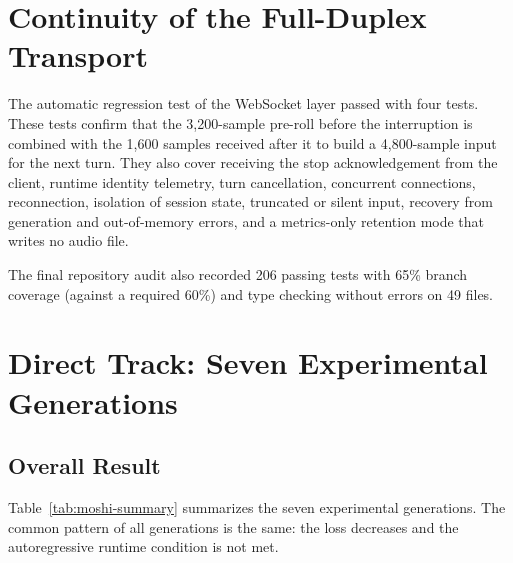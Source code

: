 
\section{Continuity of the Full-Duplex Transport}
\label{sec:res-duplex}

The automatic regression test of the WebSocket layer passed with four tests. These tests
confirm that the 3,200-sample pre-roll before the interruption is combined with the 1,600
samples received after it to build a 4,800-sample input for the next turn. They also cover
receiving the stop acknowledgement from the client, runtime identity telemetry, turn
cancellation, concurrent connections, reconnection, isolation of session state, truncated
or silent input, recovery from generation and out-of-memory errors, and a metrics-only
retention mode that writes no audio file.

The final repository audit also recorded 206 passing tests with 65\% branch coverage
(against a required 60\%) and type checking without errors on 49 files.


\section{Direct Track: Seven Experimental Generations}
\label{sec:res-moshi}

\subsection{Overall Result}

Table~\ref{tab:moshi-summary} summarizes the seven experimental generations. The common
pattern of all generations is the same: the loss decreases and the autoregressive runtime
condition is not met.

